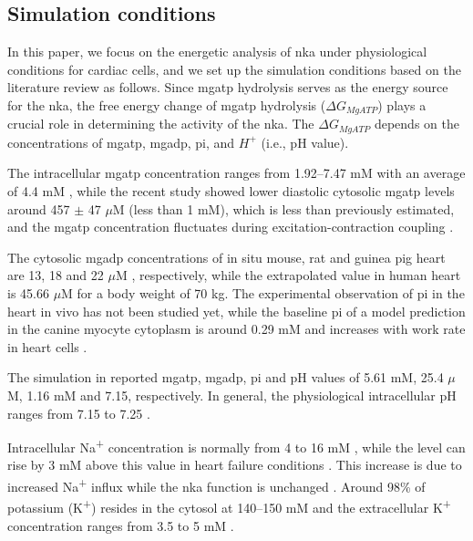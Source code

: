 \documentclass{biophys-new}
\begin{document}
\subsection*{Simulation conditions}

In this paper, we focus on the energetic analysis of \gls{nka} under physiological conditions for cardiac cells, and we set up the simulation conditions based on the literature review as follows.
Since \gls{mgatp} hydrolysis serves as the energy source for the \gls{nka}, the free energy change of \gls{mgatp} hydrolysis ($\Delta G_{MgATP}$) plays a crucial role in determining the activity of the \gls{nka}.
The $\Delta G_{MgATP}$ depends on the concentrations of \gls{mgatp}, \gls{mgadp}, \gls{pi}, and $H^+$ (i.e., pH value).

The intracellular \gls{mgatp} concentration ranges from 1.92–7.47 mM with an average of 4.4 mM \cite{greiner_intracellular_2021},
while the recent study showed lower diastolic cytosolic \gls{mgatp} levels around 457 $\pm$ 47 $\mu$M (less than 1 mM), which is less than previously estimated, and the \gls{mgatp} concentration fluctuates during excitation-contraction coupling \cite{rhana_fueling_2024}.

The cytosolic \gls{mgadp} concentrations of in situ mouse, rat and guinea pig heart are 13, 18 and 22 $\mu$M \cite{dobson_heart_2002}, respectively, while the extrapolated value in human heart is 45.66 $\mu$M for a body weight of 70 kg.
The experimental observation of \gls{pi} in the heart in vivo has not been studied yet, while the baseline \gls{pi} of a model prediction in the canine myocyte cytoplasm is around 0.29 mM and increases with work rate in heart cells \cite{wu_phosphate_2008}.


The simulation in \cite{tran_regulation_2015} reported \gls{mgatp}, \gls{mgadp}, \gls{pi} and pH values of 5.61 mM, 25.4 $\mu$M, 1.16 mM and 7.15, respectively. In general, the physiological intracellular pH ranges from 7.15 to 7.25 \cite{orlowski_intracellular_2025}.

Intracellular Na\textsuperscript{+} concentration is normally from 4 to 16 mM \cite{bers_intracellular_2003}, while the level can rise by 3 mM above this value in heart failure conditions \cite{despa_intracellular_2002}. This increase is due to increased Na\textsuperscript{+} influx while the \gls{nka} function is unchanged \cite{despa_intracellular_2002}.
Around 98\% of potassium (K\textsuperscript{+}) resides in the cytosol at 140--150 mM and the extracellular K\textsuperscript{+} concentration ranges from 3.5 to 5 mM \cite{zacchia_potassium_2016}.
\end{document}
